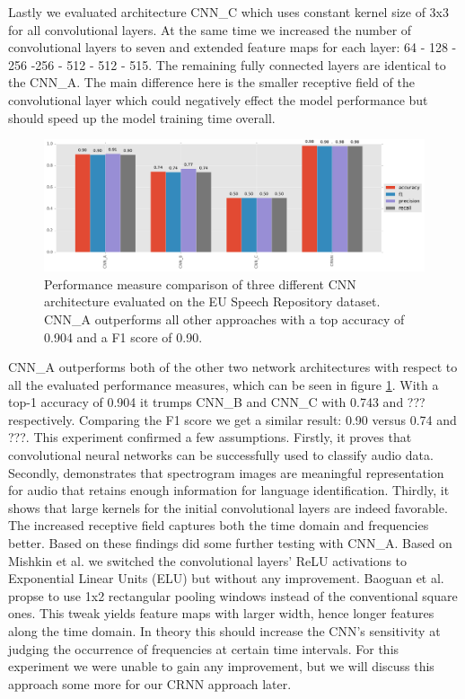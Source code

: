 Lastly we evaluated architecture CNN\_C which uses constant kernel size of 3x3 for all convolutional layers. At the same time we increased the number of convolutional layers to seven and extended feature maps for each layer: 64 - 128 - 256 -256 - 512 - 512 - 515. The remaining fully connected layers are identical to the CNN\_A. The main difference here is the smaller receptive field of the convolutional layer which could negatively effect the model performance but should speed up the model training time overall. 

	\begin{figure}[]
  		\centering
    	\includegraphics[width=\textwidth, keepaspectratio]{plots/results_eu_plot.pdf}
    	\caption{Performance measure comparison of three different CNN architecture evaluated on the EU Speech Repository dataset. CNN\_A outperforms all other approaches with a top accuracy of 0.904 and a F1 score of 0.90.}
    	\label{fig:eu_results}
	\end{figure}

CNN\_A outperforms both of the other two network architectures with respect to all the evaluated performance measures, which can be seen in figure \ref{fig:eu_results}. With a top-1 accuracy of 0.904 it trumps CNN\_B and CNN\_C with 0.743 and ??? respectively. Comparing the F1 score we get a similar result: 0.90 versus 0.74 and ???. This experiment confirmed a few assumptions. Firstly, it proves that convolutional neural networks can be successfully used to classify audio data. Secondly, demonstrates that spectrogram images are meaningful representation for audio that retains enough information for language identification. Thirdly, it shows that large kernels for the initial convolutional layers are indeed favorable. The increased receptive field captures both the time domain and frequencies better. 
Based on these findings did some further testing with CNN\_A. Based on Mishkin et al.\cite{mishkin2016systematic} we switched the convolutional layers' ReLU activations to Exponential Linear Units\cite{clevert2015fast} (ELU) but without any improvement. Baoguan et al. \cite{shi2016end} propse to use 1x2 rectangular pooling windows instead of the conventional square ones. This tweak yields feature maps with larger width, hence longer features along the time domain. In theory this should increase the CNN's sensitivity at judging the occurrence of frequencies at certain time intervals. For this experiment we were unable to gain any improvement, but we will discuss this approach some more for our CRNN approach later.

